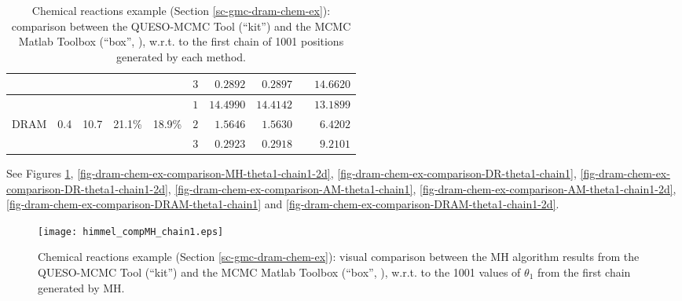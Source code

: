 \begin{table}[h!]
\begin{center}
\begin{tabular}{|c|c|c|c|c|c|r|r|r|r|}
\cline{6-10}
       &                &                  &               &                   & $3$ &  $0.2892$            &  $0.2897$              &                         & $14.6620$                \\
\hline
\hline
       &                &                  &               &                   & $1$ & $14.4990$            & $14.4142$              &                         & $13.1899$                \\
\cline{6-10}
DRAM   & 0.4            & 10.7             & 21.1\%        & 18.9\%            & $2$ &  $1.5646$            &  $1.5630$              &                         &  $6.4202$                \\
\cline{6-10}
       &                &                  &               &                   & $3$ &  $0.2923$            &  $0.2918$              &                         &  $9.2101$                \\
\hline
\end{tabular}
\caption{Chemical reactions example (Section \ref{sc-gmc-dram-chem-ex}):
comparison between the QUESO-MCMC Tool (``kit'') and the MCMC Matlab Toolbox (``box'', \cite{mcmctool}), w.r.t. to the first chain of 1001 positions generated by each method.
}
\label{tab-dram-chem-ex-comparison}
\end{center}
\end{table}

See Figures
\ref{fig-dram-chem-ex-comparison-MH-theta1-chain1},
\ref{fig-dram-chem-ex-comparison-MH-theta1-chain1-2d},
\ref{fig-dram-chem-ex-comparison-DR-theta1-chain1},
\ref{fig-dram-chem-ex-comparison-DR-theta1-chain1-2d},
\ref{fig-dram-chem-ex-comparison-AM-theta1-chain1},
\ref{fig-dram-chem-ex-comparison-AM-theta1-chain1-2d},
\ref{fig-dram-chem-ex-comparison-DRAM-theta1-chain1} and
\ref{fig-dram-chem-ex-comparison-DRAM-theta1-chain1-2d}.

\begin{figure}[h!]
\begin{center}
\texttt{[image: himmel\_compMH\_chain1.eps]}
\end{center}
\caption{Chemical reactions example (Section \ref{sc-gmc-dram-chem-ex}):
visual comparison between the MH algorithm results from the QUESO-MCMC Tool (``kit'') and the MCMC Matlab Toolbox (``box'', \cite{mcmctool}), w.r.t. to the 1001 values of $\theta_1$ from the first chain generated by MH.
}
\label{fig-dram-chem-ex-comparison-MH-theta1-chain1}
\end{figure}

